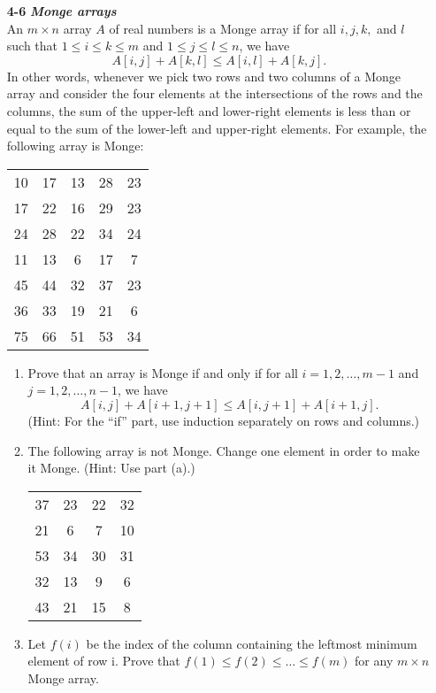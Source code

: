 \documentclass[fontsize=12pt,paper=a4]{book}
\begin{document}
\begin{enumerate}
	\item[\textbf{4-6}]
		\textbf{\textit{Monge arrays}}\\
		An $m \times n$ array $A$ of real numbers is a Monge array if for all $i, j, k,$ and $l$ such that $1 \leq i \leq k \leq m$ and $1 \leq j \leq l \leq n$, we have\\
		\[ A[i,j] + A[k,l] \leq A[i,l] + A[k,j]. \]
		In other words, whenever we pick two rows and two columns of a Monge array and
consider the four elements at the intersections of the rows and the columns, the sum
of the upper-left and lower-right elements is less than or equal to the sum of the
lower-left and upper-right elements. For example, the following array is Monge:\\
		\begin{tabular}{c c c c c}
		10 & 17 & 13 & 28 & 23 \\
		17 & 22 & 16 & 29 & 23 \\
		24 & 28 & 22 & 34 & 24 \\
		11 & 13 & 6 & 17 & 7 \\
		45 & 44 & 32 & 37 & 23 \\
		36 & 33 & 19 & 21 & 6 \\
		75 & 66 & 51 & 53 & 34 \\
		\end{tabular}
		\begin{enumerate}
			\item Prove that an array is Monge if and only if for all $i = 1, 2, \dots, m-1$ and $j = 1, 2, \dots, n-1$, we have \\
			\[A[i, j] + A[i + 1, j + 1] \leq A[i, j + 1] + A[i + 1, j].\]
			(Hint: For the “if” part, use induction separately on rows and columns.)		
			\item The following array is not Monge. Change one element in order to make it Monge. (Hint: Use part (a).) \\
			\begin{tabular}{c c c c}
				37 & 23 & 22 & 32 \\
				21 & 6 & 7 & 10 \\
				53 & 34 & 30 & 31 \\
				32 & 13 & 9 & 6 \\
				43 & 21 & 15 & 8 \\
			\end{tabular}
			\item Let $f(i)$ be the index of the column containing the leftmost minimum element of row i. Prove that $f(1) \leq f(2) \leq \dots \leq f(m)$ for any $m \times n$ Monge array.			

\end{enumerate}
\end{enumerate}
\end{document}
